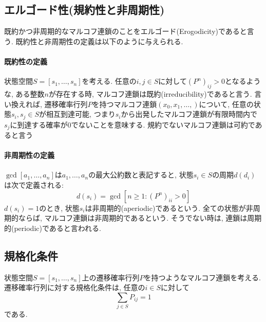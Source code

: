 \subsection{エルゴード性(規約性と非周期性)}
既約かつ非周期的なマルコフ連鎖のことをエルゴード(Erogodicity)であると言う.
既約性と非周期性の定義は以下のように与えられる.

\paragraph{既約性の定義}
状態空間$S = [s_{1}, \ldots, s_{n}]$を考える. 任意の$i, j \in S$に対して$(P^{n})_{ij} > 0$となるような, ある整数$n$が存在する時, マルコフ連鎖は既約(irreducibility)であると言う.
言い換えれば, 遷移確率行列$P$を持つマルコフ連鎖$(x_{0}, x_{1},\ldots, )$について, 任意の状態$s_i, s_j \in S$が相互到達可能, つまり$s_{i}$から出発したマルコフ連鎖が有限時間内で$s_{j}$に到達する確率が0でないことを意味する. 規約でないマルコフ連鎖は可約であると言う

\paragraph{非周期性の定義}
$\gcd[a_1, \ldots, a_n]$は$a_1,\ldots,a_n$の最大公約数と表記すると, 状態$s_{i} \in S$の周期$d(d_{i})$は次で定義される:
\begin{equation}
    d(s_{i}) = \gcd [n \ge 1: (P^{n})_{ii} > 0]
\end{equation}
$d(s_{i}) = 1$のとき, 状態$s_{i}$は非周期的(aperiodic)であるという.
全ての状態が非周期的ならば, マルコフ連鎖は非周期的であるという.
そうでない時は, 連鎖は周期的(periodic)であると言われる.

\subsection{規格化条件}
状態空間$S = [s_{1}, \ldots, s_{n}]$上の遷移確率行列$P$を持つようなマルコフ連鎖を考える.
遷移確率行列に対する規格化条件は, 任意の$i \in S$に対して
\begin{equation}
    \sum_{j \in S} P_{ij} = 1
\end{equation}
である.


